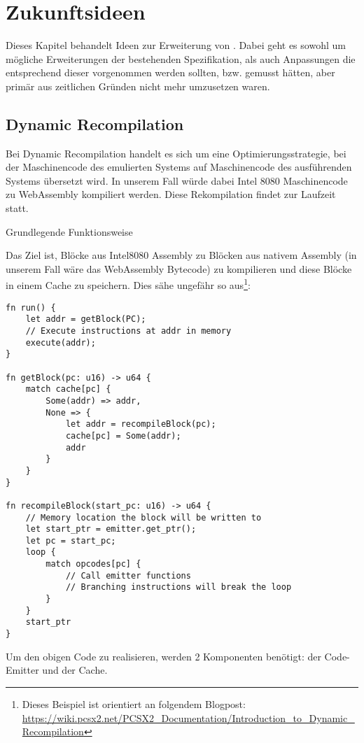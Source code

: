\chapter{Zukunftsideen}

Dieses Kapitel behandelt Ideen zur Erweiterung von \Emu. Dabei geht es sowohl um mögliche Erweiterungen der bestehenden Spezifikation, als auch Anpassungen die entsprechend dieser vorgenommen werden sollten, bzw. gemusst hätten, aber primär aus zeitlichen Gründen nicht mehr umzusetzen waren.

\section{Dynamic Recompilation}

Bei Dynamic Recompilation handelt es sich um eine Optimierungsstrategie, bei der Maschinencode des emulierten Systems auf Maschinencode des ausführenden Systems übersetzt wird. In unserem Fall würde dabei Intel 8080 Maschinencode zu WebAssembly kompiliert werden. Diese Rekompilation findet zur Laufzeit statt.

Grundlegende Funktionsweise

Das Ziel ist, Blöcke aus Intel8080 Assembly zu Blöcken aus nativem Assembly (in unserem Fall wäre das WebAssembly Bytecode) zu kompilieren und diese Blöcke in einem Cache zu speichern. Dies sähe ungefähr so aus\footnote{Dieses Beispiel ist orientiert an folgendem Blogpost: \url{https://wiki.pcsx2.net/PCSX2_Documentation/Introduction_to_Dynamic_Recompilation}}:


\begin{verbatim}
fn run() {
    let addr = getBlock(PC);
    // Execute instructions at addr in memory
    execute(addr);
}

fn getBlock(pc: u16) -> u64 {
    match cache[pc] {
        Some(addr) => addr,
        None => {
            let addr = recompileBlock(pc);
            cache[pc] = Some(addr);
            addr
        }
    }
}

fn recompileBlock(start_pc: u16) -> u64 {
    // Memory location the block will be written to
    let start_ptr = emitter.get_ptr();
    let pc = start_pc;
    loop {
        match opcodes[pc] {
            // Call emitter functions
            // Branching instructions will break the loop
        }
    }
    start_ptr
}
\end{verbatim}

Um den obigen Code zu realisieren, werden 2 Komponenten benötigt: der Code-Emitter und der Cache.

